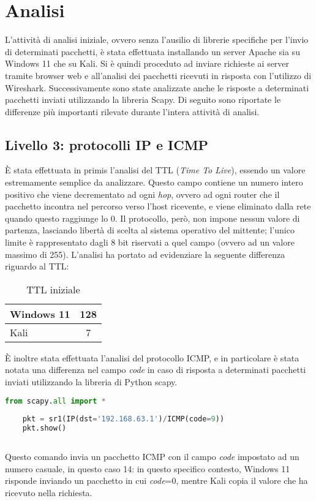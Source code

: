 \chapter{Analisi}
L'attività di analisi iniziale, ovvero senza l'ausilio di librerie specifiche per l'invio di determinati pacchetti, è stata effettuata installando un server Apache sia su Windows 11 che su Kali.
Si è quindi proceduto ad inviare richieste ai server tramite browser web e all'analisi dei pacchetti ricevuti in risposta con l'utilizzo di Wireshark.
Successivamente sono state analizzate anche le risposte a determinati pacchetti inviati utilizzando la libreria Scapy.
Di seguito sono riportate le differenze più importanti rilevate durante l'intera attività di analisi.


\section{Livello 3: protocolli IP e ICMP}
È stata effettuata in primis l'analisi del TTL (\textit{Time To Live}), essendo un valore estremamente semplice da analizzare.
Questo campo contiene un numero intero positivo che viene decrementato ad ogni \textit{hop}, ovvero ad ogni router che il pacchetto incontra nel percorso verso l'host ricevente, e viene eliminato dalla rete quando questo raggiunge lo 0.
Il protocollo, però, non impone nessun valore di partenza, lasciando libertà di scelta al sistema operativo del mittente; l'unico limite è rappresentato dagli 8 bit riservati a quel campo (ovvero ad un valore massimo di 255).
L'analisi ha portato ad evidenziare la seguente differenza riguardo al TTL:
\begin{table}[H]
	\centering
	\begin{tabular}{| l | c |}
		\hline
		\rowcolor{blue!10} Windows 11 & 128
		\\
		\hline
		\rowcolor{red!10} Kali & 7
		\\
		\hline
		
	\end{tabular}
	\caption{TTL iniziale}
	\label{tab:TTL}
\end{table}

È inoltre stata effettuata l'analisi del protocollo ICMP, e in particolare è stata notata una differenza nel campo \textit{code} in caso di risposta a determinati pacchetti inviati utilizzando la libreria di Python scapy.
\\

\begin{lstlisting}[language=Python, caption={Comando Python per l'invio del pacchetto}]
	from scapy.all import *
	
	pkt = sr1(IP(dst='192.168.63.1')/ICMP(code=9))
	pkt.show()
	
\end{lstlisting}
Questo comando invia un pacchetto ICMP con il campo \textit{code} impostato ad un numero casuale, in questo caso 14: in questo specifico contesto, Windows 11 risponde inviando un pacchetto in cui \textit{code}=0, mentre Kali copia il valore che ha ricevuto nella richiesta.

